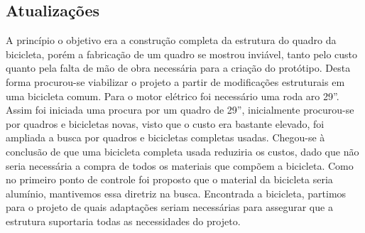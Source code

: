 	\subsection{Atualizações}
	A princípio o objetivo era a construção completa da estrutura do quadro da bicicleta, porém a fabricação de um quadro se mostrou inviável, tanto pelo custo quanto pela falta de mão de obra necessária para a criação do protótipo. Desta forma procurou-se viabilizar o projeto a partir de modificações estruturais em uma bicicleta comum. 
	Para o motor elétrico foi necessário uma roda aro 29”. Assim foi iniciada uma procura por um quadro de 29”, inicialmente procurou-se por quadros e bicicletas novas, visto que o custo era bastante elevado, foi ampliada a busca por quadros e bicicletas completas usadas. Chegou-se à conclusão de que uma bicicleta completa usada reduziria os custos, dado que não seria necessária a compra de todos os materiais que compõem a bicicleta. 
	Como no primeiro ponto de controle foi proposto que o material da bicicleta seria alumínio, mantivemos essa diretriz na busca. Encontrada a bicicleta, partimos para o projeto de quais adaptações seriam necessárias para assegurar que a estrutura suportaria todas as necessidades do projeto.
	
